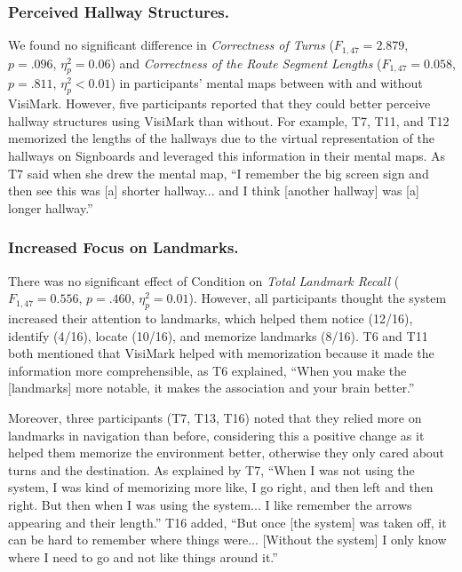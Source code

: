 \subsubsection{Perceived Hallway Structures.} We found no significant difference in \textit{Correctness of Turns} ($F_{1,47} = 2.879$, $p = .096$, $\eta _p^2 =0.06$) and \textit{Correctness of the Route Segment Lengths} ($F_{1,47} = 0.058$, $p = .811$, $\eta _p^2 < 0.01$) in participants' mental maps between with and without VisiMark. %
However, five participants reported that they could better perceive hallway structures using VisiMark than without. For example, T7, T11, and T12 memorized the lengths of the hallways due to the virtual representation of the hallways on Signboards and leveraged this information in their mental maps. As T7 said when she drew the mental map, ``I remember the big screen sign and then see this was [a] shorter hallway... and I think [another hallway] was [a] longer hallway.'' %

\subsubsection{Increased Focus on Landmarks.} There was no significant effect of Condition on \textit{Total Landmark Recall} ($F_{1,47} = 0.556$, $p = .460$, $\eta _p^2 =0.01$). However, all participants thought the system increased their attention to landmarks, which helped them notice (12/16), identify (4/16), locate (10/16), and memorize landmarks (8/16). T6 and T11 both mentioned that VisiMark helped with memorization because it made the information more comprehensible, as T6 explained, ``When you make the [landmarks] more notable, it makes the association and your brain better.'' 

Moreover, three participants (T7, T13, T16) noted that they relied more on landmarks in navigation than before, considering this a positive change as it helped them memorize the environment better, otherwise they only cared about turns and the destination. As explained by T7, ``When I was not using the system, I was kind of memorizing more like, I go right, and then left and then right. But then when I was using the system... I like remember the arrows appearing and their length.'' T16 added, ``But once [the system] was taken off, it can be hard to remember where things were... [Without the system] I only know where I need to go and not like things around it.'' %

